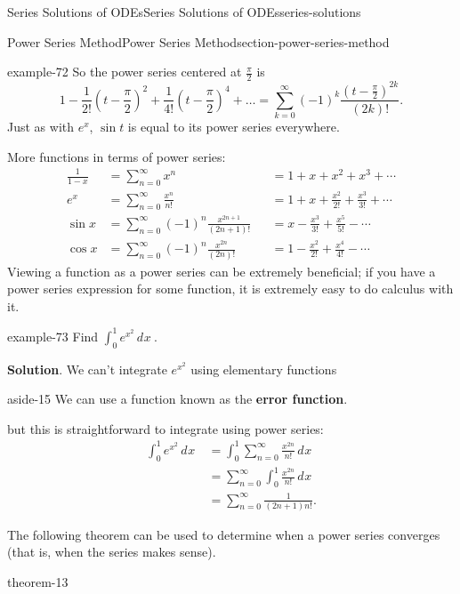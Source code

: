 \documentclass[oneside,10pt,]{book}
\newcommand{\terminology}[1]{\textbf{#1}}
\numberwithin{equation}{section}
\newcommand{\dd}[2][]{\, d^{#1} #2\ }
\newcommand{\amp}{&}
\begin{document}
\begin{chapterptx}{Series Solutions of ODEs}{}{Series Solutions of ODEs}{}{}{series-solutions}
\begin{sectionptx}{Power Series Method}{}{Power Series Method}{}{}{section-power-series-method}
\begin{example}{}{example-72}
So the power series centered at \(\frac{\pi}{2}\) is%
\begin{equation*}
1 - \frac{1}{2!}(t-\frac{\pi}{2})^{2} + \frac{1}{4!}(t-\frac{\pi}{2})^{4}+\dots = \sum_{k=0}^{\infty}(-1)^{k}\frac{(t-\frac{\pi}{2})^{2k}}{(2k)!}.
\end{equation*}
Just as with \(e^{x}\), \(\sin t\) is equal to its power series everywhere.%
\end{example}
\hypertarget{p-435}{}%
More functions in terms of power series:%
\begin{align*}
\frac{1}{1-x} \amp= \sum_{n=0}^{\infty}x^{n} \amp \amp= 1 + x + x^{2} + x^{3} + \cdots\\
e^{x} \amp= \sum_{n=0}^{\infty}\frac{x^{n}}{n!} \amp \amp= 1 + x + \frac{x^{2}}{2!} + \frac{x^{3}}{3!} + \cdots\\
\sin x \amp= \sum_{n=0}^{\infty}(-1)^{n}\frac{x^{2n+1}}{(2n+1)!} \amp \amp= x - \frac{x^{3}}{3!} + \frac{x^{5}}{5!} - \cdots\\
\cos x \amp= \sum_{n=0}^{\infty}(-1)^{n}\frac{x^{2n}}{(2n)!} \amp \amp= 1 - \frac{x^{2}}{2!} + \frac{x^{4}}{4!} - \cdots
\end{align*}
Viewing a function as a power series can be extremely beneficial; if you have a power series expression for some function, it is extremely easy to do calculus with it.%
\begin{example}{}{example-73}%
\hypertarget{p-436}{}%
Find \(\displaystyle\int_{0}^{1}e^{x^{2}}\dd{x}\).%
\par\smallskip%
\noindent\textbf{Solution}.\hypertarget{solution-70}{}\quad%
\hypertarget{p-437}{}%
We can't integrate \(e^{x^{2}}\) using elementary functions \begin{aside}{}{aside-15}%
\hypertarget{p-438}{}%
We can use a function known as the \terminology{error function}.%
\end{aside}
 but this is straightforward to integrate using power series:%
\begin{align*}
\int_{0}^{1}e^{x^{2}}\dd{x} \amp= \int_{0}^{1}\sum_{n=0}^{\infty}\frac{x^{2n}}{n!}\dd{x}\\
\amp= \sum_{n=0}^{\infty}\int_{0}^{1}\frac{x^{2n}}{n!}\dd{x}\\
\amp= \sum_{n=0}^{\infty}\frac{1}{(2n+1)n!}\text{.}
\end{align*}
%
\end{example}
\hypertarget{p-439}{}%
The following theorem can be used to determine when a power series converges (that is, when the series makes sense).%
\begin{theorem}{}{}{theorem-13}%

\end{theorem}
\end{sectionptx}
\end{chapterptx}
\end{document}
